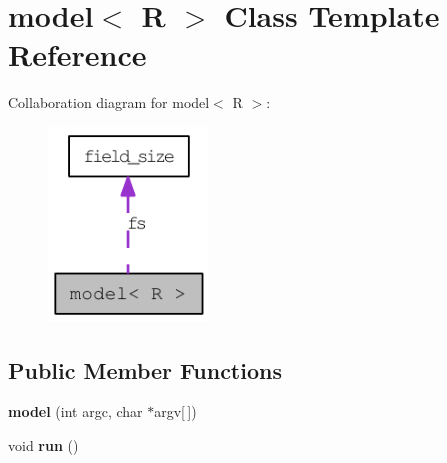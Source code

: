 \hypertarget{classmodel}{
\section{model$<$ R $>$ Class Template Reference}
\label{classmodel}
}
Collaboration diagram for model$<$ R $>$:\nopagebreak
\begin{figure}[H]
\begin{center}
\leavevmode
\includegraphics[width=120pt]{classmodel__coll__graph}
\end{center}
\end{figure}
\subsection*{Public Member Functions}
\begin{DoxyCompactItemize}
\item 
\hypertarget{classmodel_a1a3966e2e1ce020c9db63b11b21af282}{
{\bfseries model} (int argc, char $\ast$argv\mbox{[}$\,$\mbox{]})}
\label{classmodel_a1a3966e2e1ce020c9db63b11b21af282}

\item 
\hypertarget{classmodel_abaace1e276e1eb6010eb68049725d61d}{
void {\bfseries run} ()}
\label{classmodel_abaace1e276e1eb6010eb68049725d61d}

\end{DoxyCompactItemize}
